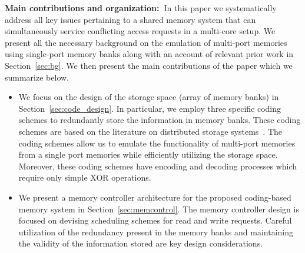 \noindent \textbf{Main contributions and organization:~}In this paper we systematically address all key issues pertaining to a shared memory system that can simultaneously service conflicting access requests in a multi-core setup. We present all the necessary background on the emulation of multi-port memories using single-port memory banks along with an account of relevant prior work in Section~\ref{sec:bg}. We then present the main contributions of the paper which we summarize below. %
\begin{itemize}
\item We focus on the design of the storage space (array of memory banks) in Section~\ref{sec:code_design}. In particular, we employ three specific coding schemes to redundantly store the information in memory banks. These coding schemes are based on the literature on distributed storage systems~\cite{dimakis, Gopalan12, batchcodes, RPDV16}. The coding schemes allow us to emulate the functionality of multi-port memories from a single port memories while efficiently utilizing the storage space. Moreover, these coding schemes have encoding and decoding processes which require only simple XOR operations. %
\item We present a memory controller architecture for the proposed coding-based memory system in Section~\ref{sec:memcontrol}. The memory controller design is focused on devising scheduling schemes for read and write requests. Careful utilization of the redundancy present in the memory banks and maintaining the validity of the information stored are key design considerations.

\end{itemize}
